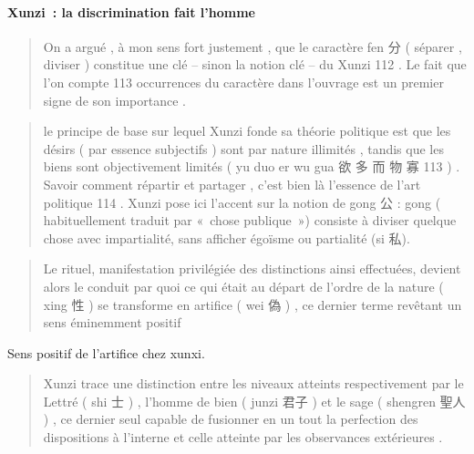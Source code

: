 \paragraph{Xunzi : la discrimination fait l’homme
 }
 \begin{quote}

On a argué , à mon sens fort justement , que le caractère fen 分 (
séparer , diviser ) constitue une clé -- sinon la notion clé -- du Xunzi
112 . Le fait que l'on compte 113 occurrences du caractère dans
l'ouvrage est un premier signe de son importance .

\end{quote}  \begin{quote}

le principe de base sur lequel Xunzi fonde sa théorie politique est que
les désirs ( par essence subjectifs ) sont par nature illimités , tandis
que les biens sont objectivement limités ( yu duo er wu gua 欲 多 而 物
寡 113 ) . Savoir comment répartir et partager , c'est bien là l'essence
de l'art politique 114 . Xunzi pose ici l'accent sur la notion de gong
公 : gong ( habituellement traduit par « chose publique ») consiste à diviser quelque chose avec impartialité, sans afficher égoïsme ou partialité (si 私).
 

\end{quote}  \begin{quote}
Le rituel, manifestation privilégiée des distinctions ainsi effectuées, devient alors le conduit par quoi ce qui était au départ
de l'ordre de la nature ( xing 性 ) se transforme en artifice ( wei 偽 )
, ce dernier terme revêtant un sens éminemment positif
 
\end{quote} 
Sens positif de l'artifice chez xunxi.
\begin{Def}[artifice]

\end{Def}
 \begin{quote}

Xunzi trace une distinction entre les niveaux atteints respectivement
par le Lettré ( shi 士 ) , l'homme de bien ( junzi 君子 ) et le sage (
shengren 聖人 ) , ce dernier seul capable de fusionner en un tout la
perfection des dispositions à l'interne et celle atteinte par les
observances extérieures .



\end{quote}


